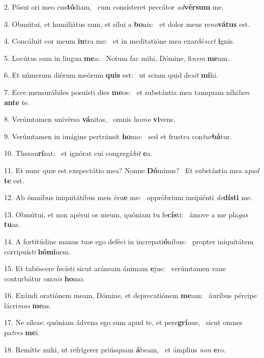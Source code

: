 2. Pósui ori meo cus\textbf{tó}diam, \ast\  cum consísteret peccátor \textit{ad}\textbf{vér}\textbf{sum} me.\

3. Obmútui, et humiliátus sum, et sílui a \textbf{bo}nis: \ast\  et dolor meus re\textit{no}\textbf{vá}\textbf{tus} est.\

4. Concáluit cor meum \textbf{in}tra me: \ast\  et in meditatióne mea exardé\textit{scet} \textbf{i}gnis.\

5. Locútus sum in lingua \textbf{me}a: \ast\  Notum fac mihi, Dómine, fi\textit{nem} \textbf{me}um.\

6. Et númerum diérum meórum \textbf{quis} est: \ast\  ut sciam quid de\textit{sit} \textbf{mi}hi.\

7. Ecce mensurábiles posuísti dies \textbf{me}os: \ast\  et substántia mea tamquam níhi\textit{lum} \textbf{an}\textbf{te} te.\

8. Verúmtamen univérsa \textbf{vá}nitas, \ast\  omnis ho\textit{mo} \textbf{vi}vens.\

9. Verúmtamen in imágine pertránsit \textbf{ho}mo: \ast\  sed et frustra con\textit{tur}\textbf{bá}tur.\

10. Thesau\textbf{rí}zat: \ast\  et ignórat cui congregá\textit{bit} \textbf{e}a.\

11. Et nunc quæ est exspectátio mea? Nonne \textbf{Dó}minus? \ast\  Et substántia mea a\textit{pud} \textbf{te} est.\

12. Ab ómnibus iniquitátibus meis éru\textbf{e} me: \ast\  oppróbrium insipiénti \textit{de}\textbf{dís}\textbf{ti} me.\

13. Obmútui, et non apérui os meum, quóniam tu fe\textbf{cís}ti: \ast\  ámove a me pla\textit{gas} \textbf{tu}as.\

14. A fortitúdine manus tuæ ego deféci in increpati\textbf{ó}nibus: \ast\  propter iniquitátem corripuís\textit{ti} \textbf{hó}\textbf{mi}nem.\

15. Et tabéscere fecísti sicut aráneam ánimam \textbf{e}jus: \ast\  verúmtamen vane conturbátur om\textit{nis} \textbf{ho}mo.\

16. Exáudi oratiónem meam, Dómine, et deprecatiónem \textbf{me}am: \ast\  áuribus pércipe lácri\textit{mas} \textbf{me}as.\

17. Ne síleas: quóniam ádvena ego sum apud te, et pere\textbf{grí}nus, \ast\  sicut omnes pa\textit{tres} \textbf{me}i.\

18. Remítte mihi, ut refrígerer priúsquam \textbf{á}beam, \ast\  et ámplius \textit{non} \textbf{e}ro.\

